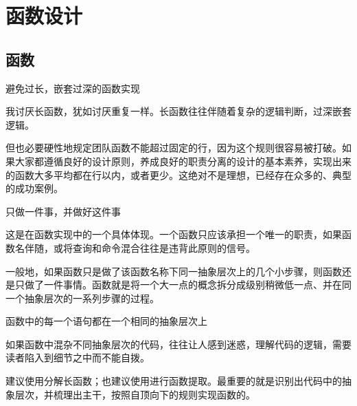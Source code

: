 \begin{savequote}[45mm]

\end{savequote}

\chapter{函数设计}
\label{ch:functions-operators}

\section{函数}

\begin{content}

\begin{regulation}
避免过长，嵌套过深的函数实现
\end{regulation}

我讨厌长函数，犹如讨厌重复一样。长函数往往伴随着复杂的逻辑判断，过深嵌套逻辑。

但也必要硬性地规定团队函数不能超过固定的行，因为这个规则很容易被打破。如果大家都遵循良好的设计原则，养成良好的职责分离的设计的基本素养，实现出来的函数大多平均都在行以内，或者更少。这绝对不是理想，已经存在众多的、典型的成功案例。

\begin{regulation}
只做一件事，并做好这件事
\end{regulation}

这是在函数实现中的一个具体体现。一个函数只应该承担一个唯一的职责，如果函数名伴随，或将查询和命令混合往往是违背此原则的信号。

一般地，如果函数只是做了该函数名称下同一抽象层次上的几个小步骤，则函数还是只做了一件事情。函数就是将一个大一点的概念拆分成级别稍微低一点、并在同一个抽象层次的一系列步骤的过程。

\begin{regulation}
函数中的每一个语句都在一个相同的抽象层次上
\end{regulation}

如果函数中混杂不同抽象层次的代码，往往让人感到迷惑，理解代码的逻辑，需要读者陷入到细节之中而不能自拨。

建议使用分解长函数；也建议使用进行函数提取。最重要的就是识别出代码中的抽象层次，并梳理出主干，按照自顶向下的规则实现函数的。


\end{content}
